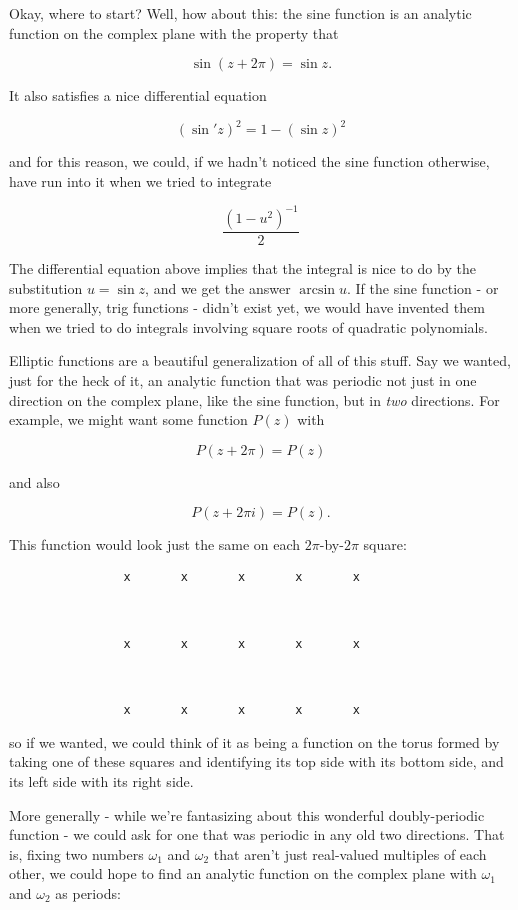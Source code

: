 \documentclass{article}
\begin{document}
Okay, where to start? Well, how about this: the sine function is an
analytic function on the complex plane with the property that

\[\sin(z + 2\pi) = \sin z.\]

It also satisfies a nice differential equation

\[(\sin' z)^2 = 1 - (\sin z)^2\]

and for this reason, we could, if we hadn't noticed the sine function
otherwise, have run into it when we tried to integrate

\[\frac{(1 - u^2)^{-1}}{2}\]

The differential equation above implies that the integral is nice to do
by the substitution \(u = \sin z\), and we get the answer \(\arcsin u\).
If the sine function - or more generally, trig functions - didn't exist
yet, we would have invented them when we tried to do integrals involving
square roots of quadratic polynomials.

Elliptic functions are a beautiful generalization of all of this stuff.
Say we wanted, just for the heck of it, an analytic function that was
periodic not just in one direction on the complex plane, like the sine
function, but in \emph{two} directions. For example, we might want some
function \(P(z)\) with

\[P(z + 2\pi) = P(z)\]

and also

\[P(z + 2\pi i) = P(z).\]

This function would look just the same on each \(2\pi\)-by-\(2\pi\)
square:

\begin{verbatim}
                x       x       x       x       x



                x       x       x       x       x



                x       x       x       x       x
\end{verbatim}

so if we wanted, we could think of it as being a function on the torus
formed by taking one of these squares and identifying its top side with
its bottom side, and its left side with its right side.

More generally - while we're fantasizing about this wonderful
doubly-periodic function - we could ask for one that was periodic in any
old two directions. That is, fixing two numbers \(\omega_1\) and
\(\omega_2\) that aren't just real-valued multiples of each other, we
could hope to find an analytic function on the complex plane with
\(\omega_1\) and \(\omega_2\) as periods:
\end{document}
